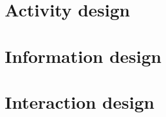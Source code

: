 \documentclass[11pt,oneside]{article}
\begin{document}
	
		
	\vspace*{0.5cm}

	
		
		
		
		\vspace*{-0.5cm}
		\tableofcontents
		\newpage



\justify
\section{Activity design}


\justify
\section{Information design}


\justify
\section{Interaction design}

\end{document}
